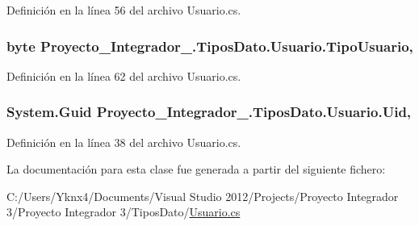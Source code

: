 Definición en la línea 56 del archivo Usuario.\-cs.

\hypertarget{class_proyecto___integrador__3_1_1_tipos_dato_1_1_usuario_a56f1e08f344ba5851703edab28232278}{
\subsubsection[{Tipo\-Usuario}]{\setlength{\rightskip}{0pt plus 5cm}byte Proyecto\-\_\-\-Integrador\-\_.\-Tipos\-Dato.\-Usuario.\-Tipo\-Usuario\hspace{0.3cm}{\ttfamily [get]}, {\ttfamily [set]}}}\label{class_proyecto___integrador__3_1_1_tipos_dato_1_1_usuario_a56f1e08f344ba5851703edab28232278}


Definición en la línea 62 del archivo Usuario.\-cs.

\hypertarget{class_proyecto___integrador__3_1_1_tipos_dato_1_1_usuario_ae9cfa8c8b462028b8c166f7a1eff5f1f}{
\subsubsection[{Uid}]{\setlength{\rightskip}{0pt plus 5cm}System.\-Guid Proyecto\-\_\-\-Integrador\-\_.\-Tipos\-Dato.\-Usuario.\-Uid\hspace{0.3cm}{\ttfamily [get]}, {\ttfamily [set]}}}\label{class_proyecto___integrador__3_1_1_tipos_dato_1_1_usuario_ae9cfa8c8b462028b8c166f7a1eff5f1f}


Definición en la línea 38 del archivo Usuario.\-cs.



La documentación para esta clase fue generada a partir del siguiente fichero\-:\begin{DoxyCompactItemize}
\item 
C\-:/\-Users/\-Yknx4/\-Documents/\-Visual Studio 2012/\-Projects/\-Proyecto Integrador 3/\-Proyecto Integrador 3/\-Tipos\-Dato/\hyperlink{_usuario_8cs}{Usuario.\-cs}\end{DoxyCompactItemize}
